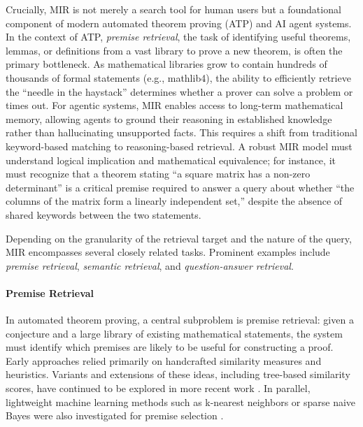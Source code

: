 \documentclass[11pt]{article}
\numberwithin{equation}{section}
\begin{document}
Crucially, MIR is not merely a search tool for human users but a foundational component of modern automated theorem proving (ATP) and AI agent systems. In the context of ATP, \textit{premise retrieval}, the task of identifying useful theorems, lemmas, or definitions from a vast library to prove a new theorem, is often the primary bottleneck. As mathematical libraries grow to contain hundreds of thousands of formal statements (e.g., mathlib4), the ability to efficiently retrieve the ``needle in the haystack'' determines whether a prover can solve a problem or times out. For agentic systems, MIR enables access to long-term mathematical memory, allowing agents to ground their reasoning in established knowledge rather than hallucinating unsupported facts. This requires a shift from traditional keyword-based matching to reasoning-based retrieval. A robust MIR model must understand logical implication and mathematical equivalence; for instance, it must recognize that a theorem stating ``a square matrix has a non-zero determinant'' is a critical premise required to answer a query about whether ``the columns of the matrix form a linearly independent set,'' despite the absence of shared keywords between the two statements.

Depending on the granularity of the retrieval target and the nature of the query, MIR encompasses several closely related tasks. Prominent examples include \textit{premise retrieval}, \textit{semantic retrieval}, and \textit{question-answer retrieval}. 


\paragraph{Premise Retrieval}


In automated theorem proving, a central subproblem is premise retrieval: given a conjecture and a large library of existing mathematical statements, the system must identify which premises are likely to be useful for constructing a proof. Early approaches relied primarily on handcrafted similarity measures and heuristics\cite{hoder2011sine,meng2009lightweight}. Variants and extensions of these ideas, including tree-based similarity scores, have continued to be explored in more recent work \cite{wang2025treebased}. In parallel, lightweight machine learning methods such as k-nearest neighbors or sparse naive Bayes were also investigated for premise selection \cite{czajka2018hammer}.
\end{document}

